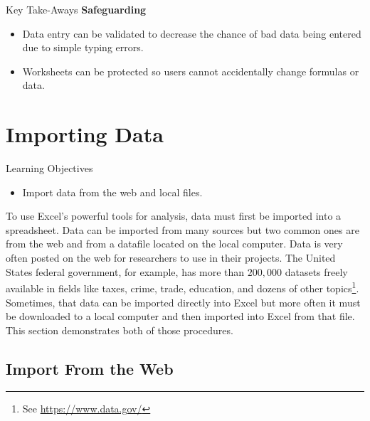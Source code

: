 \begin{center}
	\begin{tkwbox}{Key Take-Aways}
		\textbf{Safeguarding}
		\\
		\begin{itemize}
			\setlength{\itemsep}{0pt}
			\setlength{\parskip}{0pt}
			\setlength{\parsep}{0pt}
			
			\item Data entry can be validated to decrease the chance of bad data being entered due to simple typing errors.
			\item Worksheets can be protected so users cannot accidentally change formulas or data.
			
		\end{itemize}
	\end{tkwbox}
\end{center}

\section{Importing Data}

\begin{center}
	\begin{objbox}{Learning Objectives}
		\begin{itemize}
			\setlength{\itemsep}{0pt}
			\setlength{\parskip}{0pt}
			\setlength{\parsep}{0pt}
			
			\item Import data from the web and local files.

		\end{itemize}
	\end{objbox}
\end{center}

To use Excel's powerful tools for analysis, data must first be imported into a spreadsheet. Data can be imported from many sources but two common ones are from the web and from a datafile located on the local computer. Data is very often posted on the web for researchers to use in their projects. The United States federal government, for example, has more than $ 200,000 $ datasets freely available in fields like taxes, crime, trade, education, and dozens of other topics\footnote{See \url{https://www.data.gov/}}. Sometimes, that data can be imported directly into Excel but more often it must be downloaded to a local computer and then imported into Excel from that file. This section demonstrates both of those procedures.

\subsection{Import From the Web}

